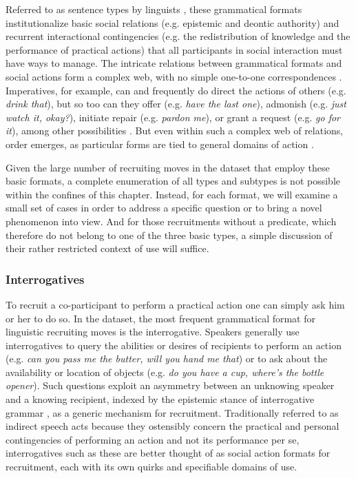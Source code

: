 \documentclass[output=paper,nonflat,modfont,draft]{langsci/langscibook}
\begin{document}
\newpage
Referred to as sentence types by linguists \citep{SadockZwicky1985, Palmer2001, KönigSiemund2007}, these grammatical formats institutionalize basic social relations (e.g. epistemic and deontic authority) and recurrent interactional contingencies (e.g. the redistribution of knowledge and the performance of practical actions) that all participants in social interaction must have ways to manage. The intricate relations between grammatical formats and social actions form a complex web, with no simple one-to-one correspondences \citep{Schegloff1984, Levinson2013}. Imperatives, for example, can and frequently do direct the actions of others (e.g. \textit{drink that}), but so too can they offer (e.g. \textit{have the last one}), admonish (e.g. \textit{just watch it, okay?}), initiate repair (e.g. \textit{pardon me}), or grant a request (e.g. \textit{go for it}), among other possibilities \citep{KentKendrick2016}. But even within such a complex web of relations, order emerges, as particular forms are tied to general domains of action \citep{Couperkuhlen2015}.

Given the large number of recruiting moves in the dataset that employ these basic formats, a complete enumeration of all types and subtypes is not possible within the confines of this chapter. Instead, for each format, we will examine a small set of cases in order to address a specific question or to bring a novel phenomenon into view. And for those recruitments without a predicate, which therefore do not belong to one of the three basic types, a simple discussion of their rather restricted context of use will suffice.

\subsubsection{Interrogatives}\label{sec:kendrick:4.2.1}
To recruit a co-participant to perform a practical action one can simply ask him or her to do so. In the dataset, the most frequent grammatical format for linguistic recruiting moves is the interrogative. Speakers generally use interrogatives to query the abilities or desires of recipients to perform an action (e.g. \textit{can you pass me the butter, will you hand me that}) or to ask about the availability or location of objects (e.g. \textit{do you have a cup, where’s the bottle opener}). Such questions exploit an asymmetry between an unknowing speaker and a knowing recipient, indexed by the epistemic stance of interrogative grammar \citep{heritage_terms_2005, heritage2012}, as a generic mechanism for recruitment. Traditionally referred to as indirect speech acts \citep{Searle1975, BrownLevinson1987} because they ostensibly concern the practical and personal contingencies of performing an action and not its performance per se, interrogatives such as these are better thought of as social action formats \citep{Fox2007} for recruitment, each with its own quirks and specifiable domains of use.
\end{document}

